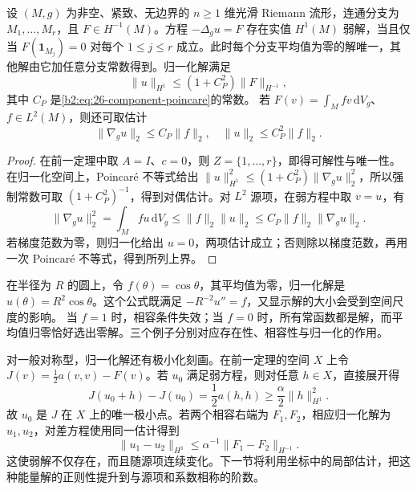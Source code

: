 \begin{corollary}
\label{b2:cor:26-poisson-solvability}
设 \((M,g)\) 为非空、紧致、无边界的 \(n\geq1\) 维光滑 Riemann 流形，连通分支为 \(M_1,\ldots,M_r\)，且 \(F\in H^{-1}(M)\)。方程 \(-\Delta_gu=F\) 存在实值 \(H^1(M)\) 弱解，当且仅当
\(F(\mathbf1_{M_j})=0\) 对每个 \(1\leq j\leq r\) 成立。此时每个分支平均值为零的解唯一，其他解由它加任意分支常数得到。归一化解满足
\[
 \|u\|_{H^1}\leq(1+C_P^2)\|F\|_{H^{-1}},
\]
其中 \(C_P\) 是\eqref{b2:eq:26-component-poincare}的常数。
若 \(F(v)=\int_Mfv\,\mathrm dV_g\)、\(f\in L^2(M)\)，则还可取估计
\[
 \|\nabla_g u\|_2\leq C_P\|f\|_2,
 \quad \|u\|_2\leq C_P^2\|f\|_2.
\]
\end{corollary}
\begin{proof}
在前一定理中取 \(A=I\)、\(c=0\)，则 \(Z=\{1,\ldots,r\}\)，即得可解性与唯一性。在归一化空间上，Poincaré 不等式给出
\(\|u\|_{H^1}^2\leq(1+C_P^2)\|\nabla_g u\|_2^2\)，所以强制常数可取 \((1+C_P^2)^{-1}\)，得到对偶估计。对 \(L^2\) 源项，在弱方程中取 \(v=u\)，有
\[
 \|\nabla_g u\|_2^2
 =\int_Mfu\,\mathrm dV_g
 \leq\|f\|_2\|u\|_2
 \leq C_P\|f\|_2\|\nabla_g u\|_2.
\]
若梯度范数为零，则归一化给出 \(u=0\)，两项估计成立；否则除以梯度范数，再用一次 Poincaré 不等式，得到所列上界。
\end{proof}

在半径为 \(R\) 的圆上，令 \(f(\theta)=\cos\theta\)，其平均值为零，归一化解是
\(u(\theta)=R^2\cos\theta\)。这个公式既满足
\(-R^{-2}u''=f\)，又显示解的大小会受到空间尺度的影响。
当 \(f=1\) 时，相容条件失效；当 \(f=0\) 时，所有常函数都是解，而平均值归零恰好选出零解。三个例子分别对应存在性、相容性与归一化的作用。

对一般对称型，归一化解还有极小化刻画。在前一定理的空间 \(X\) 上令
\(J(v)=\tfrac12a(v,v)-F(v)\)。若 \(u_0\) 满足弱方程，则对任意 \(h\in X\)，直接展开得
\[
 J(u_0+h)-J(u_0)=\frac12a(h,h)\geq\frac\alpha2\|h\|_{H^1}^2.
\]
故 \(u_0\) 是 \(J\) 在 \(X\) 上的唯一极小点。若两个相容右端为 \(F_1,F_2\)，相应归一化解为 \(u_1,u_2\)，对差方程使用同一估计得到
\[
 \|u_1-u_2\|_{H^1}
 \leq\alpha^{-1}\|F_1-F_2\|_{H^{-1}}.
\]
这使弱解不仅存在，而且随源项连续变化。下一节将利用坐标中的局部估计，把这种能量解的正则性提升到与源项和系数相称的阶数。
